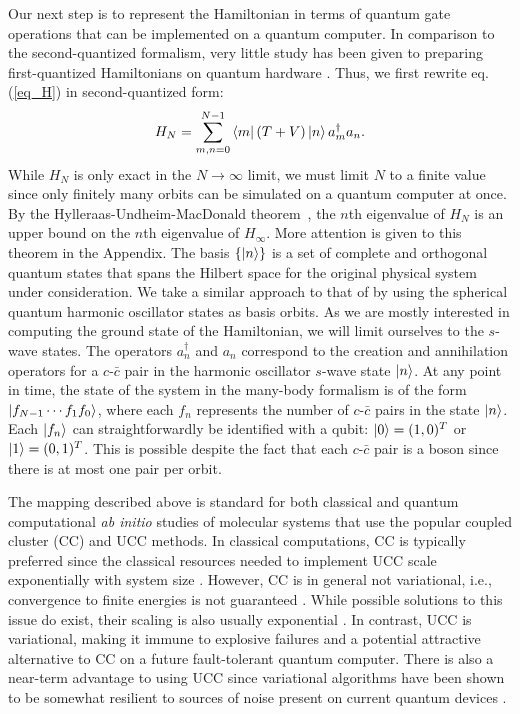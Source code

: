 \documentclass[aps,10pt,superscriptaddress,floatfix,nofootinbib,notitlepage]{revtex4-1}
\begin{document}
Our next step is to represent the Hamiltonian in terms of quantum gate operations that can be implemented on a quantum computer. In comparison to the second-quantized formalism, very little study has been given to preparing first-quantized Hamiltonians on quantum hardware \cite{Tilly_2021}. Thus, we first rewrite eq. (\ref{eq_H}) in second-quantized form:
\begin{equation}\label{eq_H3}
    H_N
    =\sum_{m,n=0}^{N-1}
    \bra{m}
    (T+V)
    \ket{n}
    a_m^\dag
    a_n.
\end{equation} 
While $H_N$ is only exact in the $N\rightarrow\infty$ limit, we must limit $N$ to a finite value since only finitely many orbits can be simulated on a quantum computer at once. By the Hylleraas-Undheim-MacDonald theorem~\cite{HU1930,PhysRev.43.830}, the $n$th eigenvalue of $H_N$ is an upper bound on the $n$th eigenvalue of $H_\infty$. More attention is given to this theorem in the Appendix. The basis $\{\ket{n}\}$ is a set of complete and orthogonal quantum states that spans the Hilbert space for the original physical system under consideration. We take a similar approach to that of \cite{Dumitrescu_2018} by using the spherical quantum harmonic oscillator states as basis orbits. As we are mostly interested in computing the ground state of the Hamiltonian, we will limit ourselves to the $s$-wave states. The operators $a_n^\dag$ and $a_n$ correspond to the creation and annihilation operators for a $c$-$\bar{c}$ pair in the harmonic oscillator $s$-wave state $\ket{n}$. At any point in time, the state of the system in the many-body formalism is of the form $\ket{f_{N-1}\cdots f_1f_0}$, where each $f_n$ represents the number of $c$-$\bar{c}$ pairs in the state $\ket{n}$. Each $\ket{f_n}$ can straightforwardly be identified with a qubit: $\ket{0}=(1,0)^T$ or $\ket{1}=(0,1)^T$. This is possible despite the fact that each $c$-$\bar{c}$ pair is a boson since there is at most one pair per orbit.

The mapping described above is standard for both classical and quantum computational \textit{ab initio} studies of molecular systems that use the popular coupled cluster (CC) and UCC methods. In classical computations, CC is typically preferred since the classical resources needed to implement UCC scale exponentially with system size \cite{Tilly_2021}. However, CC is in general not variational, i.e., convergence to finite energies is not guaranteed \cite{Anand_2022,Tilly_2021}. While possible solutions to this issue do exist, their scaling is also usually exponential \cite{Tilly_2021}. In contrast, UCC is variational, making it immune to explosive failures and a potential attractive alternative to CC on a future fault-tolerant quantum computer. There is also a near-term advantage to using UCC since variational algorithms have been shown to be somewhat resilient to sources of noise present on current quantum devices \cite{Tilly_2021}.
\end{document}
